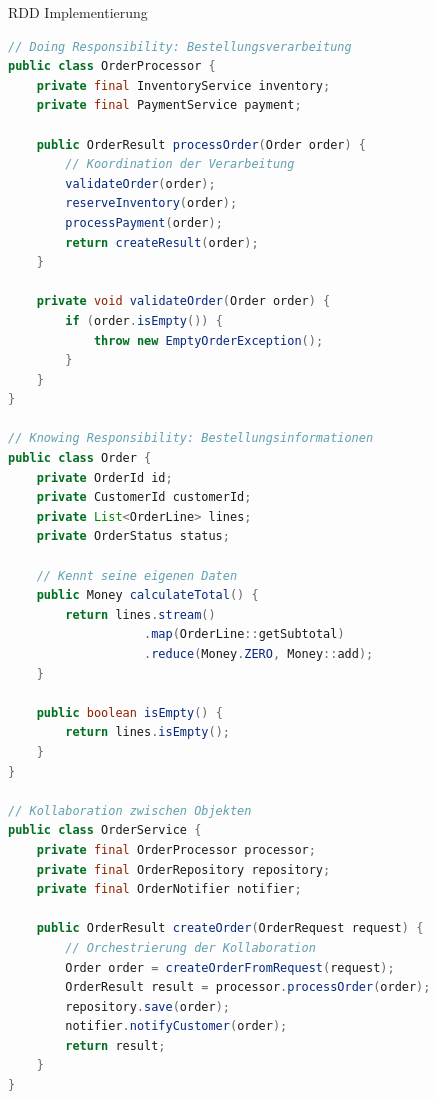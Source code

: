 \begin{example2}{RDD Implementierung}
\begin{lstlisting}[language=Java, style=basesmol]
// Doing Responsibility: Bestellungsverarbeitung
public class OrderProcessor {
    private final InventoryService inventory;
    private final PaymentService payment;
    
    public OrderResult processOrder(Order order) {
        // Koordination der Verarbeitung
        validateOrder(order);
        reserveInventory(order);
        processPayment(order);
        return createResult(order);
    }
    
    private void validateOrder(Order order) {
        if (order.isEmpty()) {
            throw new EmptyOrderException();
        }
    }
}

// Knowing Responsibility: Bestellungsinformationen
public class Order {
    private OrderId id;
    private CustomerId customerId;
    private List<OrderLine> lines;
    private OrderStatus status;
    
    // Kennt seine eigenen Daten
    public Money calculateTotal() {
        return lines.stream()
                   .map(OrderLine::getSubtotal)
                   .reduce(Money.ZERO, Money::add);
    }
    
    public boolean isEmpty() {
        return lines.isEmpty();
    }
}

// Kollaboration zwischen Objekten
public class OrderService {
    private final OrderProcessor processor;
    private final OrderRepository repository;
    private final OrderNotifier notifier;
    
    public OrderResult createOrder(OrderRequest request) {
        // Orchestrierung der Kollaboration
        Order order = createOrderFromRequest(request);
        OrderResult result = processor.processOrder(order);
        repository.save(order);
        notifier.notifyCustomer(order);
        return result;
    }
}
\end{lstlisting}
\end{example2}

